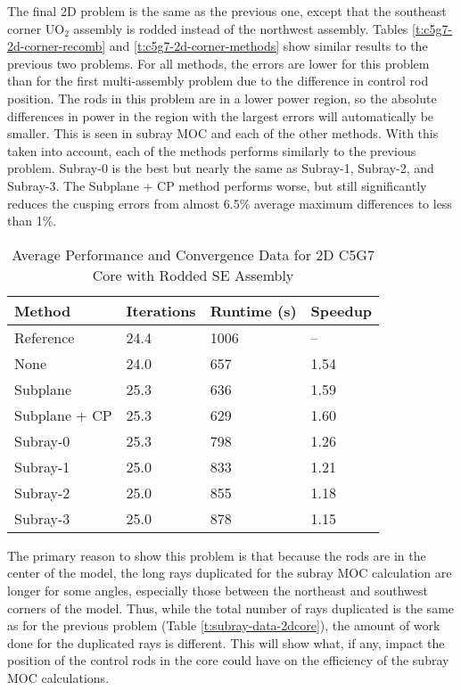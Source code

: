 The final 2D problem is the same as the previous one, except that the southeast corner UO$_2$ assembly is rodded instead of the northwest assembly.  Tables \ref{t:c5g7-2d-corner-recomb} and \ref{t:c5g7-2d-corner-methods} show similar results to the previous two problems.  For all methods, the errors are lower for this problem than for the first multi-assembly problem due to the difference in control rod position.  The rods in this problem are in a lower power region, so the absolute differences in power in the region with the largest errors will automatically be smaller.  This is seen in subray MOC and each of the other methods.  With this taken into account, each of the methods performs similarly to the previous problem.  Subray-0 is the best but nearly the same as Subray-1, Subray-2, and Subray-3.  The Subplane + CP method performs worse, but still significantly reduces the cusping errors from almost 6.5\% average maximum differences to less than 1\%.

\begin{table}[h]
    \centering
    \caption[2D C5G7 Core Performance Data, Corner Assembly]{Average Performance and Convergence Data for 2D C5G7 Core with Rodded SE Assembly}\label{t:subray-performance-2dcoreSE}
    \begin{tabular}{l l l l}\toprule
        Method & Iterations & Runtime (s) & Speedup \\\midrule
Reference     & 24.4 & 1006 & --  \\
None          & 24.0 & 657 & 1.54 \\
Subplane      & 25.3 & 636 & 1.59 \\
Subplane + CP & 25.3 & 629 & 1.60 \\
Subray-0      & 25.3 & 798 & 1.26 \\
Subray-1      & 25.0 & 833 & 1.21 \\
Subray-2      & 25.0 & 855 & 1.18 \\
Subray-3      & 25.0 & 878 & 1.15 \\
        \bottomrule
    \end{tabular}
\end{table}

The primary reason to show this problem is that because the rods are in the center of the model, the long rays duplicated for the subray MOC calculation are longer for some angles, especially those between the northeast and southwest corners of the model.  Thus, while the total number of rays duplicated is the same as for the previous problem (Table \ref{t:subray-data-2dcore}), the amount of work done for the duplicated rays is different.  This will show what, if any, impact the position of the control rods in the core could have on the efficiency of the subray MOC calculations.

